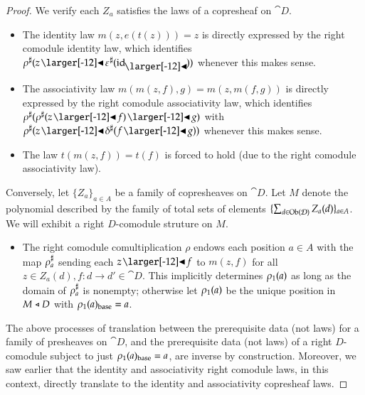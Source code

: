 \documentclass{amsart}
\begin{document}
\begin{proof}
  We verify each $Z_a$ satisfies the laws of a copresheaf on $\cat{D}$.
  \begin{itemize}
  \item The identity law $m(z, e(t(z))) = z$ is directly expressed by
    the right comodule identity law, which identifies
    ${\anydirmapof{\rho}{z \subd \anydirmapof{\varepsilon}{\idsubd}}}$
    whenever this makes sense.
  \item The associativity law $m(m(z, f), g) = m(z, m(f, g))$ is
    directly expressed by the right comodule associativity law, which
    identifies
    ${\anydirmapof{\rho}{\anydirmapof{\rho}{z \subd f} \subd g}}$ with
    ${\anydirmapof{\rho}{z \subd \anydirmapof{\delta}{f \subd g}}}$ whenever this makes sense.
  \item The law $t(m(z, f)) = t(f)$ is forced to hold (due to the
    right comodule associativity law).
  \end{itemize}

  Conversely, let $\{Z_a\}_{a \in A}$ be a family of copresheaves on
  $\cat{D}$. Let $M$ denote the polynomial described by the family of
  total sets of elements
  $\{\sum_{d \in \operatorname{Ob}(\mathcal{D})}Z_a(d)\}_{a \in A}$. We will exhibit a right
  $D$-comodule struture on $M$.
  \begin{itemize}
  \item The right comodule comultiplication $\rho$ endows each position $a \in A$ with
    the map ${\rho}^\sharp_{a}$ sending each $z \subd f$ to $m(z, f)$ for
    all $z \in Z_a(d), f: d \to d' \in \cat{D}$. This implicitly
    determines ${\rho}_1(a)$ as long as the domain of ${\rho}^\sharp_{a}$ is
    nonempty; otherwise let ${\rho}_1(a)$ be the unique position in
    $M \mathrel{\triangleleft} D$ with ${\rho}_1(a)_{\mathrm{base}} = a$.
  \end{itemize}

  The above processes of translation between the prerequisite data
  (not laws) for a family of presheaves on $\cat{D}$, and the
  prerequisite data (not laws) of a right $D$-comodule subject to just
  ${\rho}_1(a)_{\mathrm{base}} = a$, are inverse by
  construction. Moreover, we saw earlier that the identity and
  associativity right comodule laws, in this context, directly translate
  to the identity and associativity copresheaf laws.
\end{proof}
\end{document}
